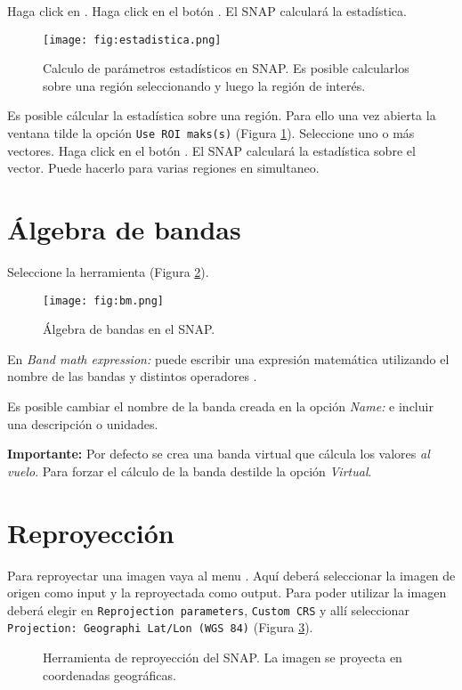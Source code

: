 Haga click en . Haga click en el botón . El SNAP calculará la estadística.

\begin{figure}[ht!]
    \centering
    \texttt{[image: fig:estadistica.png]}
    \caption{Calculo de parámetros estadísticos en SNAP. Es posible calcularlos sobre una región seleccionando  y luego la región de interés.}
    \label{fig:estadistica}
\end{figure}


Es posible cálcular la estadística sobre una región. Para ello una vez abierta la ventana tilde la opción \texttt{Use ROI maks(s)} (Figura \ref{fig:estadistica}). Seleccione uno o más vectores. Haga click en el botón . El SNAP calculará la estadística sobre el vector. Puede hacerlo para varias regiones en simultaneo.

\section{Álgebra de bandas}

 Seleccione la herramienta  (Figura \ref{fig:bm}).

 \begin{figure}[h!]
     \centering
     \texttt{[image: fig:bm.png]}
     \caption{Álgebra de bandas en el SNAP.}
     \label{fig:bm}
 \end{figure}

 En \emph{Band math expression:} puede escribir una expresión matemática utilizando el nombre de las bandas y distintos operadores .

 Es posible cambiar el nombre de la banda creada en la opción \emph{Name:} e incluir una descripción o unidades.

 {\bf Importante:} Por defecto se crea una banda virtual que cálcula los valores \emph{al vuelo}. Para forzar el cálculo de la banda destilde la opción \emph{Virtual}.

 \section{Reproyección}

 Para reproyectar una imagen vaya al menu . Aquí deberá seleccionar la imagen de origen como input y la reproyectada como output. Para poder utilizar la imagen deberá elegir en \texttt{Reprojection parameters}, \texttt{Custom CRS} y allí seleccionar \texttt{Projection: Geographi Lat/Lon (WGS 84)} (Figura \ref{fig:reproj}).

 \begin{figure}[h!]
     \centering
     \hspace{1cm}
     \caption{Herramienta de reproyección del SNAP. La imagen se proyecta en coordenadas geográficas.}
     \label{fig:reproj}
 \end{figure}

